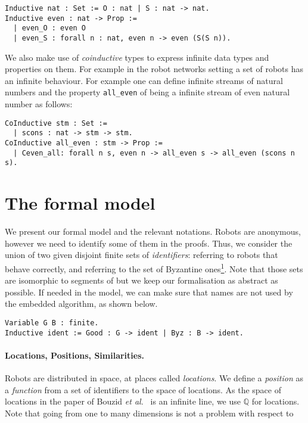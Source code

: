 \documentclass[11pt,a4]{llncs}
\newcommand{\x}{\xspace}
\newcommand{\setQ}{\ensuremath{\mathbb{Q}}\x}
\begin{document}
\begin{lstlisting}
Inductive nat : Set := O : nat | S : nat -> nat.
Inductive even : nat -> Prop := 
  | even_O : even O 
  | even_S : forall n : nat, even n -> even (S(S n)).
\end{lstlisting}

We also make use of \emph{coinductive} types to express infinite data
types and properties on them. For example in the robot networks setting
a set of robots has an infinite behaviour. For example one can define infinite
streams of natural numbers and the property \texttt{\small all\_even}
of being a infinite stream of even natural number as follows:

\begin{lstlisting}
CoInductive stm : Set :=
  | scons : nat -> stm -> stm.
CoInductive all_even : stm -> Prop :=
  | Ceven_all: forall n s, even n -> all_even s -> all_even (scons n s).
\end{lstlisting}


\section{The formal model}
\label{sec:formal-model}


We present our formal model and the relevant notations. Robots are
anonymous, however we need to identify some of them in the proofs. Thus, we consider the
union of two given disjoint finite sets of \emph{identifiers}:  referring
to robots that behave correctly, and  referring to the set of
Byzantine ones\footnote{We will omit  and  most of the time, except in
  Section~\ref{sec:some-proofs} where they characterise the number of robots.}. Note that those sets are isomorphic to segments of
 but we keep our formalisation as abstract as possible. If
needed in the model, we can make sure that names are not used by the
embedded algorithm, as shown below.

\begin{lstlisting}
Variable G B : finite.
Inductive ident := Good : G -> ident | Byz : B -> ident.
\end{lstlisting}

\paragraph*{Locations, Positions, Similarities.}
Robots are distributed in space, at places called \emph{locations}.
We define a \emph{position} as a \emph{function} from a set of identifiers to
the space of locations. As the space of locations in the paper of
Bouzid \emph{et al.}~\cite{bouzid10tcs} is an infinite line, we use \setQ
for locations. Note that going from one to many dimensions is not a
problem with respect to our formalisation.  Throughout this article,
and unless specified otherwise  denotes a position for
correct robots, and  a position for Byzantine ones. The position of
all robots is then given by the combination .
\end{document}
